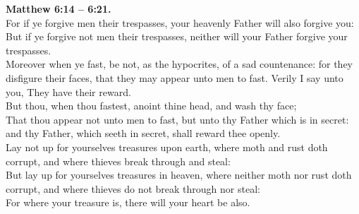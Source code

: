 \documentclass[10pt]{article} %
\begin{document}
{\begin{minipage}[t]{0.45\textwidth}
\textbf{Matthew 6:14 -- 6:21.}\\
For if ye forgive men their trespasses, your heavenly Father will also forgive you:\\
But if ye forgive not men their trespasses, neither will your Father forgive your trespasses.\\
Moreover when ye fast, be not, as the hypocrites, of a sad countenance: for they disfigure their faces, that they may appear unto men to fast. Verily I say unto you, They have their reward.\\
But thou, when thou fastest, anoint thine head, and wash thy face;\\
That thou appear not unto men to fast, but unto thy Father which is in secret: and thy Father, which seeth in secret, shall reward thee openly.\\
Lay not up for yourselves treasures upon earth, where moth and rust doth corrupt, and where thieves break through and steal:\\
But lay up for yourselves treasures in heaven, where neither moth nor rust doth corrupt, and where thieves do not break through nor steal:\\
For where your treasure is, there will your heart be also.\\

\end{minipage}}
\vspace*{\fill}
\newpage
\huge%
\vspace*{\fill}
\begin{spacing}{1.7}
\end{spacing}
\vspace*{\fill}
\end{document}
